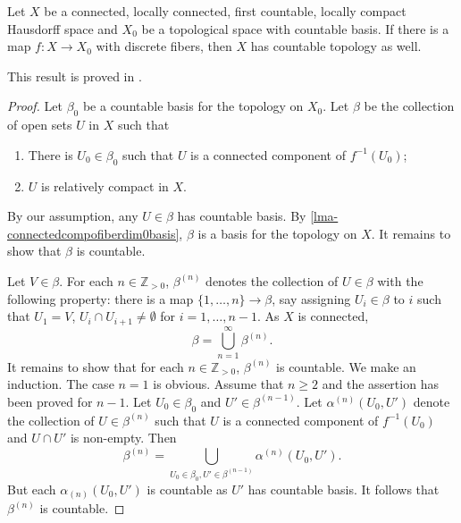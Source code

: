 \begin{proposition}\label{prop-fiberdiscountablebasisinh}
    Let $X$ be a connected, locally connected, first countable, locally compact Hausdorff space and $X_0$ be a topological space with countable basis. If there is a map $f:X\rightarrow X_0$ with discrete fibers, then $X$ has countable topology as well.
\end{proposition}
This result is proved in \cite{Jur59}.

\begin{proof}
    Let $\beta_0$ be a countable basis for the topology on $X_0$. Let $\beta$ be the collection of open sets $U$ in $X$ such that
    \begin{enumerate}
        \item There is $U_0\in \beta_0$ such that $U$ is a connected component of $f^{-1}(U_0)$;
        \item $U$ is relatively compact in $X$.
    \end{enumerate}
    By our assumption, any $U\in \beta$ has countable basis. By \cref{lma-connectedcompofiberdim0basis}, $\beta$ is a basis for the topology on $X$. It remains to show that $\beta$ is countable.

    Let $V\in \beta$. For each $n\in \mathbb{Z}_{>0}$, $\beta^{(n)}$ denotes the collection of $U\in \beta$ with the following property: there is a map $\{1,\ldots,n\}\rightarrow \beta$, say assigning $U_i\in \beta$ to $i$ such that $U_1=V$, $U_i\cap U_{i+1}\neq \emptyset$ for $i=1,\ldots,n-1$. As $X$ is connected,
    \[
        \beta=\bigcup_{n=1}^{\infty}\beta^{(n)}.  
    \]
    It remains to show that for each $n\in \mathbb{Z}_{>0}$, $\beta^{(n)}$ is countable. We make an induction. The case $n=1$ is obvious. Assume that $n\geq 2$ and the assertion has been proved for $n-1$. Let $U_0\in \beta_0$ and $U'\in \beta^{(n-1)}$. Let $\alpha^{(n)}(U_0,U')$ denote the collection of $U\in \beta^{(n)}$ such that $U$ is a connected component of $f^{-1}(U_0)$ and $U\cap U'$ is non-empty. Then
    \[
        \beta^{(n)}=\bigcup_{U_0\in \beta_0,U'\in \beta^{(n-1)}}\alpha^{(n)}(U_0,U').  
    \]
    But each $\alpha_{(n)}(U_0,U')$ is countable as $U'$ has countable basis. It follows that $\beta^{(n)}$ is countable.
\end{proof}

